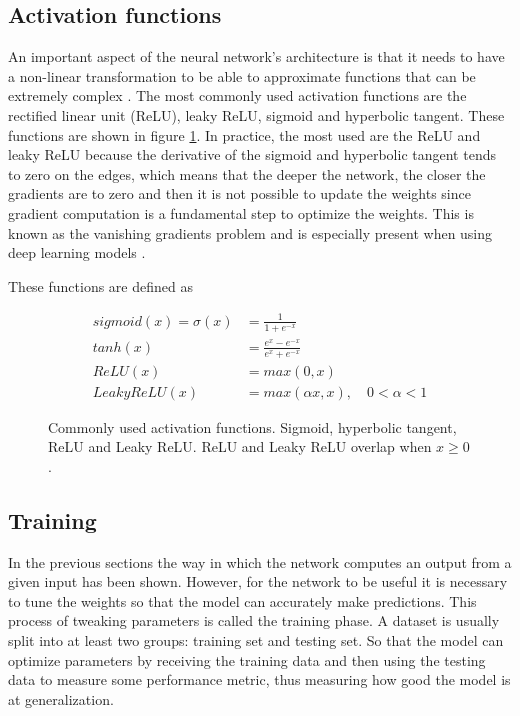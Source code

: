 \subsection{Activation functions}
An important aspect of the neural network's architecture is that it needs to have a non-linear transformation to be able to approximate functions that can be extremely complex \cite{Hornik, Cybenko}. The most commonly used activation functions are the rectified linear unit (ReLU), leaky ReLU, sigmoid and hyperbolic tangent. These functions are shown in figure \ref{fig:activations}. In practice, the most used are the ReLU and leaky ReLU because the derivative of the sigmoid and hyperbolic tangent tends to zero on the edges, which means that the deeper the network, the closer the gradients are to zero and then it is not possible to update the weights since gradient computation is a fundamental step to optimize the weights. This is known as the vanishing gradients problem and is especially present when using deep learning models \cite{vanishing-gradient, Hinton2010}.

These functions are defined as

\begin{align*}
    sigmoid(x)=\sigma(x) &= \frac{1}{1+e^{-x}} \\
    tanh(x) &= \frac{e^x-e^{-x}}{e^x+e^{-x}} \\
    ReLU(x) &= max(0,x)\\
    LeakyReLU(x) &= max(\alpha x, x),\quad 0<\alpha < 1
\end{align*}

\begin{figure}
    \centering
    
    \caption[Commonly used activation functions]{Commonly used activation functions. Sigmoid, hyperbolic tangent, ReLU and Leaky ReLU. ReLU and Leaky ReLU overlap when $x\geq0$.}
   \label{fig:activations}
\end{figure}

\subsection{Training}
In the previous sections the way in which the network computes an output from a given input has been shown. However, for the network to be useful it is necessary to tune the weights so that the model can accurately make predictions. This process of tweaking parameters is called the training phase. A dataset is usually split into at least two groups: training set and testing set. So that the model can optimize parameters by receiving the training data and then using the testing data to measure some performance metric, thus measuring how good the model is at generalization.

